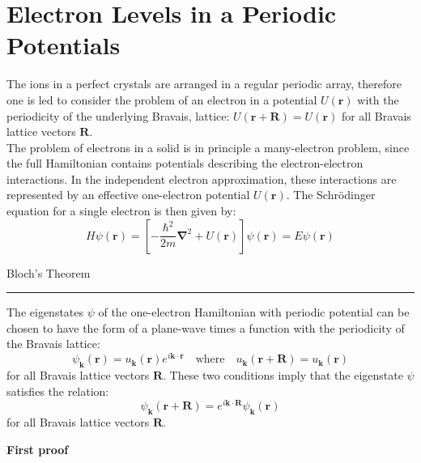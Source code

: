 \documentclass[10.75pt,a4paper,openright,bottom=2cm]{article}
\renewcommand{\Vec}[1]{\boldsymbol{#1}}
\begin{document}
\section{Electron Levels in a Periodic Potentials}
The ions in a perfect crystals are arranged in a regular periodic array, therefore one is led to consider the problem of an electron in a potential $U(\Vec{r})$ with the periodicity of the underlying Bravais, lattice: $U(\Vec{r}+\Vec{R})=U(\Vec{r})$ for all Bravais lattice vectors $\Vec{R}$.\\
The problem of electrons in a solid is in principle a many-electron problem, since the full Hamiltonian contains potentials describing the electron-electron interactions. In the independent electron approximation, these interactions are represented by an effective one-electron potential $U(\Vec{r})$. The Schr\"odinger equation for a single electron is then given by:
\[
H\psi(\Vec{r})=\left[-\frac{\hbar^2}{2m}\Vec{\nabla}^2+U(\Vec{r})\right]\psi(\Vec{r})=E\psi(\Vec{r})
\]
\begin{mybox}
Bloch's Theorem{\color{blue!30}{g}}
\hrule
\vspace{0.25cm}
The eigenstates $\psi$ of the one-electron Hamiltonian with periodic potential can be chosen to have the form of a plane-wave times a function with the periodicity of the Bravais lattice:
\[
\psi_{\Vec{k}}(\Vec{r})=u_{\Vec{k}}(\Vec{r})e^{i\Vec{k}\cdot\Vec{r}} \quad \text{where} \quad u_{\Vec{k}}(\Vec{r}+\Vec{R})=u_{\Vec{k}}(\Vec{r})
\]
for all Bravais lattice vectors $\Vec{R}$. These two conditions imply that the eigenstate $\psi$ satisfies the relation:
\[
\psi_{\Vec{k}}(\Vec{r}+\Vec{R})=e^{i\Vec{k}\cdot\Vec{R}}\psi_{\Vec{k}}(\Vec{r})
\]
for all Bravais lattice vectors $\Vec{R}$.
\end{mybox}
\noindent
\textbf{First proof}
\end{document}
